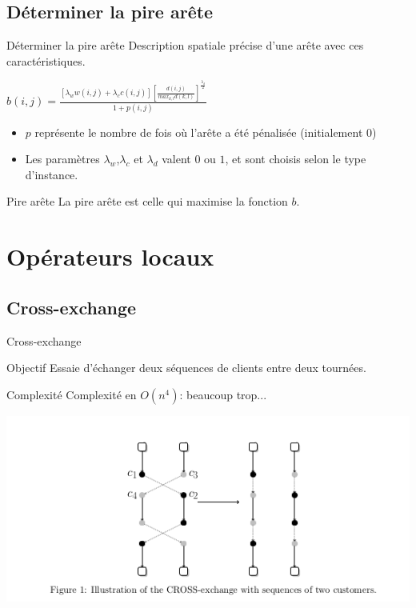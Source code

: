 \documentclass{beamer}
\begin{document}
\subsection{Déterminer la pire arête}

\begin{frame}{Déterminer la pire arête}
Description spatiale précise d'une arête avec ces caractéristiques. 
\begin{center}
$b(i,j) = \frac{[\lambda_w w(i,j) + \lambda_c c(i,j)] [\frac{d(i,j)}{max_{k,l}d(k,l)}] ^ {\frac{\lambda_d}{2}}}{1+p(i,j)}$
\end{center}

\begin{itemize}
\item $p$ représente le nombre de fois où l'arête a été pénalisée (initialement 0)

\item Les paramètres $\lambda_w$,$\lambda_c$ et $\lambda_d$ valent $0$ ou $1$, et sont choisis selon le type d'instance.
\end{itemize}

\begin{exampleblock}{Pire arête}
La pire arête est celle qui maximise la fonction $b$.
\end{exampleblock}
\end{frame}

\section{Opérateurs locaux}

\subsection{Cross-exchange}

\begin{frame}{Cross-exchange}

\begin{block}{Objectif}
Essaie d'échanger deux séquences de clients entre deux tournées. 
\end{block}

\begin{alertblock}{Complexité}
Complexité en $O(n^4)$: beaucoup trop...
\end{alertblock}

	\centering
	\includegraphics[height=0.4\textheight]{cross_exchange.png}
\end{frame}
\end{document}
